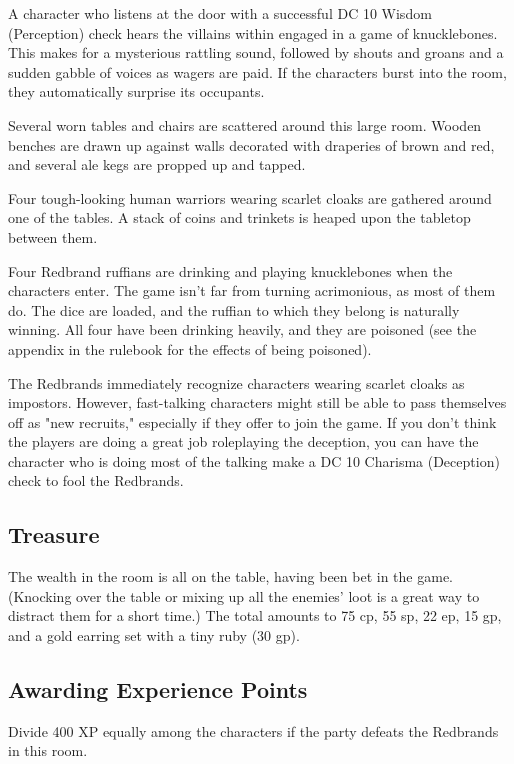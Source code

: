 \documentclass[10pt,a4paper,twoside,bg=print,twocolumn,openany,nodeprecatedcode]{dndbook}
\begin{document}
A character who listens at the door with a successful DC 10 Wisdom (Perception) check hears the villains within engaged in a game of knucklebones. This makes for a mysterious rattling sound, followed by shouts and groans and a sudden gabble of voices as wagers are paid. If the characters burst into the room, they automatically surprise its occupants.

\begin{DndReadAloud}{}
Several worn tables and chairs are scattered around this large room. Wooden benches are drawn up against walls decorated with draperies of brown and red, and several ale kegs are propped up and tapped.

Four tough-looking human warriors wearing scarlet cloaks are gathered around one of the tables. A stack of coins and trinkets is heaped upon the tabletop between them.

\end{DndReadAloud}

Four Redbrand ruffians are drinking and playing knucklebones when the characters enter. The game isn't far from turning acrimonious, as most of them do. The dice are loaded, and the ruffian to which they belong is naturally winning. All four have been drinking heavily, and they are poisoned (see the appendix in the rulebook for the effects of being poisoned).

The Redbrands immediately recognize characters wearing scarlet cloaks as impostors. However, fast-talking characters might still be able to pass themselves off as "new recruits," especially if they offer to join the game. If you don't think the players are doing a great job roleplaying the deception, you can have the character who is doing most of the talking make a DC 10 Charisma (Deception) check to fool the Redbrands.

\subsection{Treasure}
The wealth in the room is all on the table, having been bet in the game. (Knocking over the table or mixing up all the enemies' loot is a great way to distract them for a short time.) The total amounts to 75 cp, 55 sp, 22 ep, 15 gp, and a gold earring set with a tiny ruby (30 gp).

\subsection{Awarding Experience Points}
Divide 400 XP equally among the characters if the party defeats the Redbrands in this room.
\end{document}
